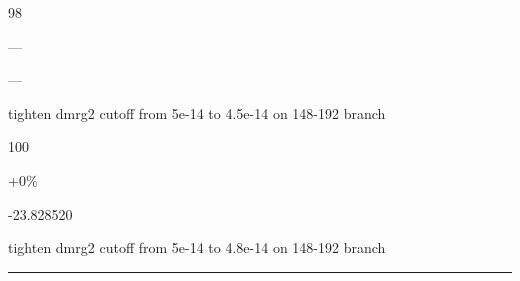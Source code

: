 \noindent\parbox[t]{0.05\linewidth}{\centering\strut 98}\hspace{0.006\linewidth}\parbox[t]{0.04\linewidth}{\centering\strut {}}\hspace{0.006\linewidth}\parbox[t]{0.10\linewidth}{\centering\strut ---}\hspace{0.006\linewidth}\parbox[t]{0.115\linewidth}{\centering\strut ---}\hspace{0.006\linewidth}\parbox[t]{0.671\linewidth}{tighten dmrg2 cutoff from 5e-14 to 4.5e-14 on 148-192 branch}\par\smallskip
{}\par\smallskip
\noindent\parbox[t]{0.05\linewidth}{\centering\strut 100}\hspace{0.006\linewidth}\parbox[t]{0.04\linewidth}{\centering\strut {}}\hspace{0.006\linewidth}\parbox[t]{0.10\linewidth}{\centering\strut +0\%}\hspace{0.006\linewidth}\parbox[t]{0.115\linewidth}{\centering\strut -23.828520}\hspace{0.006\linewidth}\parbox[t]{0.671\linewidth}{tighten dmrg2 cutoff from 5e-14 to 4.8e-14 on 148-192 branch}\par\smallskip
\noindent\rule{\linewidth}{0.5pt}
\par\medskip

\medskip

